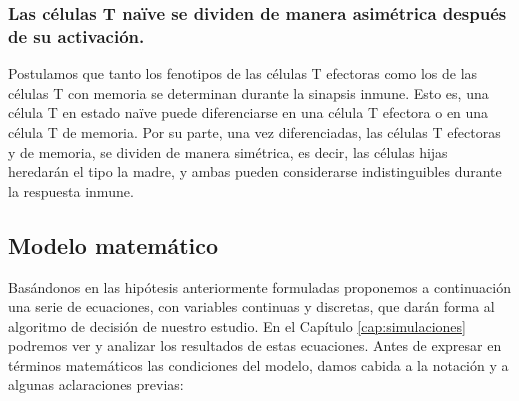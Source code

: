 \subsubsection{Las células T naïve se dividen de manera asimétrica después de su activación.}
\label{subsub:hip_divAsim}

Postulamos que tanto los fenotipos de las células T efectoras como los de las células T con memoria se determinan durante la sinapsis inmune. Esto es, una célula T en estado naïve puede diferenciarse en una célula T efectora o en una célula T de memoria. Por su parte, una vez diferenciadas, las células T efectoras y de memoria, se dividen de manera simétrica, es decir, las células hijas heredarán el tipo la madre, y ambas pueden considerarse indistinguibles durante la respuesta inmune.

\subsection{Modelo matemático}
\label{sub:modelo}

Basándonos en las hipótesis anteriormente formuladas proponemos a continuación una serie de ecuaciones, con variables continuas y discretas, que darán forma al algoritmo de decisión de nuestro estudio. 
En el Capítulo \ref{cap:simulaciones} podremos ver y analizar los resultados de estas ecuaciones. 
Antes de expresar en términos matemáticos las condiciones del modelo, damos cabida a la notación y a algunas aclaraciones previas: 

